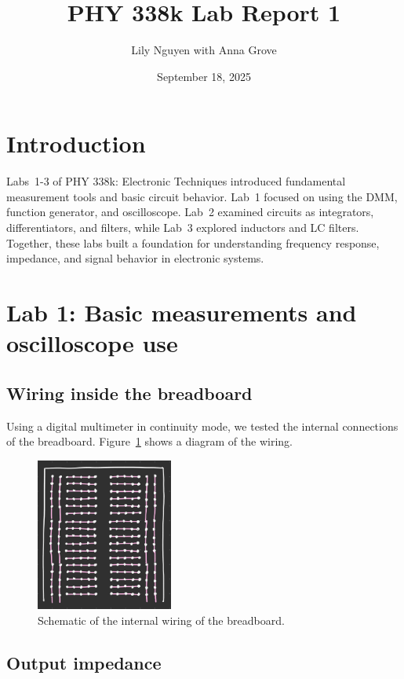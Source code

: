 \documentclass{article}
\title{PHY 338k Lab Report 1}
\author{Lily Nguyen with Anna Grove}
\date{September 18, 2025}
\begin{document}
\maketitle

\section{Introduction}

Labs~1-3 of PHY 338k: Electronic Techniques introduced fundamental measurement
tools and basic circuit behavior. Lab~1 focused on using the DMM, function
generator, and oscilloscope. Lab~2 examined circuits as integrators, differentiators,
and filters, while Lab~3 explored inductors and LC filters. Together, these labs 
built a foundation for understanding frequency response, impedance, and signal
behavior in electronic systems.

\section{Lab 1: Basic measurements and oscilloscope use}

\subsection{Wiring inside the breadboard}

Using a digital multimeter in continuity mode, we tested the internal
connections of the breadboard. Figure~\ref{fig:breadboard} shows a diagram
of the wiring.

\begin{figure}[h!]
    \centering
    \includegraphics[width=0.4\textwidth]{1.1a.png}
    \caption{Schematic of the internal wiring of the breadboard.}
    \label{fig:breadboard}
\end{figure}

\subsection{Output impedance}
\end{document}

